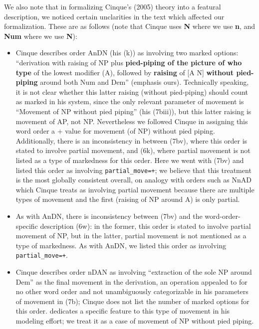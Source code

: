 \documentclass[11pt]{article}
\begin{document}
We also note that in formalizing Cinque's (2005) theory into a
featural description, we noticed certain unclarities in the text which
affected our formalization.  These are as follows (note that Cinque
uses \textbf{N} where we use \textbf{n}, and \textbf{Num} where we use
\textbf{N}):
%
\begin{itemize}
\item  Cinque describes order AnDN (his (k)) as involving two marked
  options: ``derivation with raising of NP plus \textbf{pied-piping of
    the picture of who type} of the lowest modifier (A), followed by
  \textbf{raising} of [A N] \textbf{without pied-piping} around both
  Num and Dem'' (emphasis ours).  Technically speaking, it is not
  clear whether this latter raising (without pied-piping) should count as marked
  in his system, since the only relevant parameter of movement 
   is ``Movement of NP without pied piping'' (his (7biii)), but this
   latter raising is movement of AP, not NP.  Nevertheless we followed
   Cinque in assigning this word order a $+$ value for movement
   (of NP) without pied piping.  Additionally, there is an
   inconsistency in \citet{cinque2005deriving} between (7bv), where
   this order is stated to involve partial movement, and (6k), where
   partial movement is not listed as a type of markedness for this
   order. Here we went with (7bv) and listed this order as involving
   \verb-partial_move=+-; we believe that this treatment is the most
   globally consistent overall, on analogy with orders such as NnAD
   which Cinque treats as involving partial movement because there are
   multiple types of movement and the first (raising of NP around A)
   is only partial.
 \item As with AnDN, there is inconsistency between (7bv) and the
   word-order-specific description (6w): in the  former, this order is
   stated to involve partial movement of NP, but in the latter,
   partial movement is not mentioned as a type of markedness.  As with AnDN,
   we listed this order as involving \verb-partial_move=+-.   %
 \item Cinque describes order nDAN as involving ``extraction of the
   sole NP around Dem'' as the final movement in the derivation, an
   operation appealed to for no other word order and not unambiguously
   categorizable in his parameters of movement in (7b); Cinque does
   not list the number of marked options for this order.
   \citet{cysouw2010dealing} dedicates a specific feature to this type
   of movement in his modeling effort; we treat it as a case of
   movement of NP without pied piping.
\end{itemize}
\end{document}
